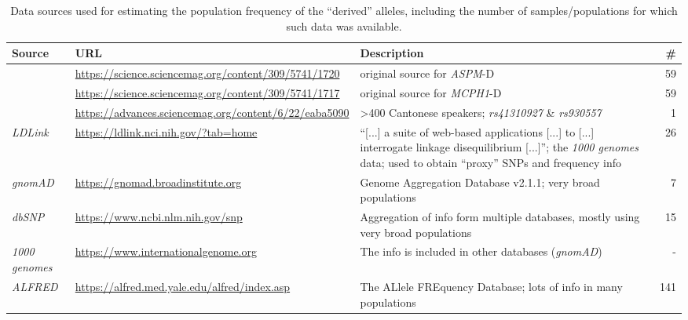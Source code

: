\documentclass[twoside,twocolumn]{article}
\begin{document}
\begin{table}[h]
	\caption{Data sources used for estimating the population frequency of the ``derived'' alleles, including the number of samples/populations for which such data was available.}
	\label{Tab:gene_data_sources}
	\centering
	\begin{tabularx}{\textwidth}{|X|X|X|r|}
		\toprule
		\textbf{Source} & \textbf{URL} & \textbf{Description} & \textbf{\#} \\
		\midrule
		\citet{mekelbobrov_aspm_2005} & \url{https://science.sciencemag.org/content/309/5741/1720} & original source for \textit{ASPM}-D & 59 \\
		\citet{evans_microcephalin_2005} & \url{https://science.sciencemag.org/content/309/5741/1717} & original source for \textit{MCPH1}-D & 59 \\
		\citet{wong_sciadv_2020} & \url{https://advances.sciencemag.org/content/6/22/eaba5090} & >400 Cantonese speakers; \textit{rs41310927} \& \textit{rs930557} & 1 \\
		\textit{LDLink} & \url{https://ldlink.nci.nih.gov/?tab=home} & ``[...] a suite of web-based applications [...] to [...] interrogate linkage disequilibrium [...]''; the \textit{1000 genomes} data; used to obtain ``proxy'' SNPs and frequency info & 26 \\
		\textit{gnomAD} & \url{https://gnomad.broadinstitute.org} & Genome Aggregation Database v2.1.1; very broad populations & 7 \\
		\textit{dbSNP} & \url{https://www.ncbi.nlm.nih.gov/snp} & Aggregation of info form multiple databases, mostly using very broad populations & 15 \\
		\textit{1000 genomes} & \url{https://www.internationalgenome.org} & The info is included in other databases (\textit{gnomAD}) & - \\
		\textit{ALFRED} &	\url{https://alfred.med.yale.edu/alfred/index.asp} & The ALlele FREquency Database; lots of info in many populations & 141 \\
		\bottomrule
	\end{tabularx}
\end{table}
\end{document}
